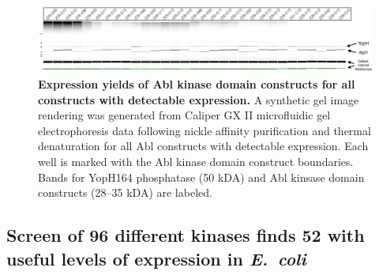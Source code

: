 \documentclass[9pt,lineno]{elife}
\begin{document}
\begin{figure}[t!]
\centering
\begin{fullwidth}
   \includegraphics[width=\linewidth]{abl1-construct-gel.png}
  \caption{{\bf Expression yields of Abl kinase domain constructs for all constructs with detectable expression.}
   A synthetic gel image rendering was generated from Caliper GX II microfluidic gel electrophoresis data following nickle affinity purification and thermal denaturation for all Abl constructs with detectable expression. 
   Each well is marked with the Abl kinase domain construct boundaries. 
   Bands for YopH164 phosphatase (50 kDA) and Abl kinsase domain constructs (28--35 kDA) are labeled. 
   }
  \label{fig:abl1_caliper_image}
  \end{fullwidth}
\end{figure}

\subsection{Screen of 96 different kinases finds 52 with useful levels of expression in \emph{E.~coli}}
\end{document}
